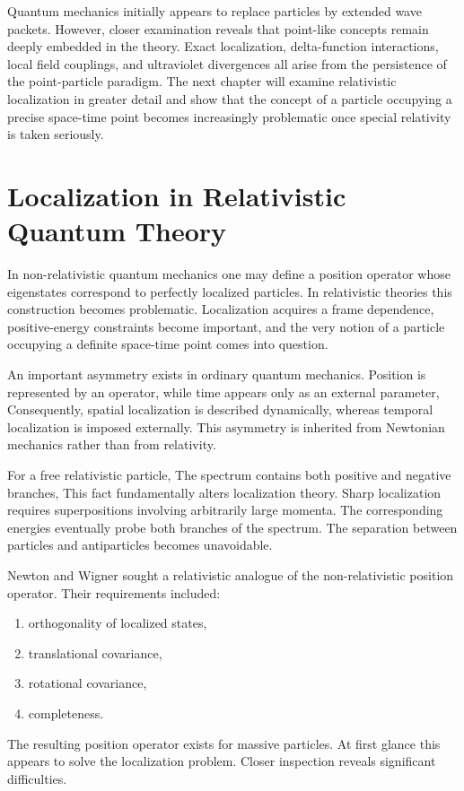 Quantum mechanics initially appears to replace particles by extended wave packets.
However, closer examination reveals that point-like concepts remain deeply 
embedded in the theory. Exact localization, delta-function interactions, local 
field couplings, and ultraviolet divergences all arise from the persistence of 
the point-particle paradigm.
The next chapter will examine relativistic localization in greater detail and 
show that the concept of a particle occupying a precise space-time point 
becomes increasingly problematic once special relativity is taken seriously.

\section{Localization in Relativistic Quantum Theory}
In non-relativistic quantum mechanics one may define a position operator 
whose eigenstates correspond to perfectly localized particles. In relativistic
theories this construction becomes problematic. Localization acquires a 
frame dependence, positive-energy constraints become important, and the very 
notion of a particle occupying a definite space-time point comes into question.

An important asymmetry exists in ordinary quantum mechanics.
Position is represented by an operator,
while time appears only as an external parameter,
Consequently, spatial localization is described dynamically, whereas temporal 
localization is imposed externally.
This asymmetry is inherited from Newtonian mechanics rather than from relativity.

For a free relativistic particle,
The spectrum contains both positive and negative branches,
This fact fundamentally alters localization theory.
Sharp localization requires superpositions involving arbitrarily large momenta.
The corresponding energies eventually probe both branches of the spectrum.
The separation between particles and antiparticles becomes unavoidable.

Newton and Wigner sought a relativistic analogue of the non-relativistic 
position operator.
Their requirements included:
\begin{enumerate}
\item orthogonality of localized states,
\item translational covariance,
\item rotational covariance,
\item completeness.
\end{enumerate}
The resulting position operator exists for massive particles.
At first glance this appears to solve the localization problem.
Closer inspection reveals significant difficulties.

